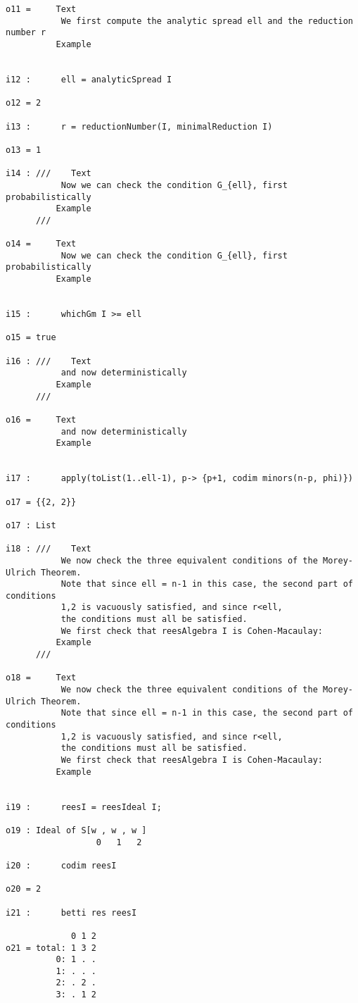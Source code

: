\documentclass[twoside,12pt, leqno]{amsart}
\begin{document}
\begin{verbatim}
o11 =     Text
           We first compute the analytic spread ell and the reduction number r
          Example


i12 :      ell = analyticSpread I

o12 = 2

i13 :      r = reductionNumber(I, minimalReduction I)

o13 = 1

i14 : ///    Text
           Now we can check the condition G_{ell}, first probabilistically
          Example
      ///    

o14 =     Text
           Now we can check the condition G_{ell}, first probabilistically
          Example


i15 :      whichGm I >= ell

o15 = true

i16 : ///    Text
           and now deterministically
          Example
      ///    

o16 =     Text
           and now deterministically
          Example


i17 :      apply(toList(1..ell-1), p-> {p+1, codim minors(n-p, phi)})

o17 = {{2, 2}}

o17 : List

i18 : ///    Text
           We now check the three equivalent conditions of the Morey-Ulrich Theorem.
           Note that since ell = n-1 in this case, the second part of conditions
           1,2 is vacuously satisfied, and since r<ell,
           the conditions must all be satisfied.
           We first check that reesAlgebra I is Cohen-Macaulay:
          Example
      ///    

o18 =     Text
           We now check the three equivalent conditions of the Morey-Ulrich Theorem.
           Note that since ell = n-1 in this case, the second part of conditions
           1,2 is vacuously satisfied, and since r<ell,
           the conditions must all be satisfied.
           We first check that reesAlgebra I is Cohen-Macaulay:
          Example


i19 :      reesI = reesIdeal I;

o19 : Ideal of S[w , w , w ]
                  0   1   2

i20 :      codim reesI

o20 = 2

i21 :      betti res reesI

             0 1 2
o21 = total: 1 3 2
          0: 1 . .
          1: . . .
          2: . 2 .
          3: . 1 2


\end{verbatim}
\end{document}
